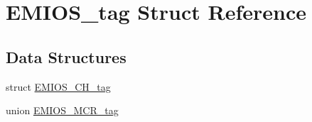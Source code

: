\hypertarget{structEMIOS__tag}{}\section{E\+M\+I\+O\+S\+\_\+tag Struct Reference}
\label{structEMIOS__tag}
\subsection*{Data Structures}
\begin{DoxyCompactItemize}
\item 
struct \mbox{\hyperlink{structEMIOS__tag_1_1EMIOS__CH__tag}{E\+M\+I\+O\+S\+\_\+\+C\+H\+\_\+tag}}
\item 
union \mbox{\hyperlink{unionEMIOS__tag_1_1EMIOS__MCR__tag}{E\+M\+I\+O\+S\+\_\+\+M\+C\+R\+\_\+tag}}
\end{DoxyCompactItemize}

